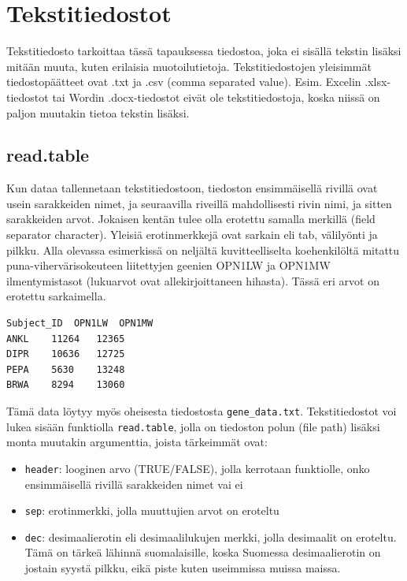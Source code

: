 \documentclass[
]{book}
\providecommand{\tightlist}{%
  \setlength{\itemsep}{0pt}\setlength{\parskip}{0pt}}
\begin{document}
\hypertarget{tekstitiedostot}{%
\section{Tekstitiedostot}\label{tekstitiedostot}}

Tekstitiedosto tarkoittaa tässä tapauksessa tiedostoa, joka ei sisällä tekstin lisäksi mitään muuta, kuten erilaisia muotoilutietoja. Tekstitiedostojen yleisimmät tiedostopäätteet ovat .txt ja .csv (comma separated value). Esim. Excelin .xlsx-tiedostot tai Wordin .docx-tiedostot eivät ole tekstitiedostoja, koska niissä on paljon muutakin tietoa tekstin lisäksi.

\hypertarget{read.table}{%
\subsection{read.table}\label{read.table}}

Kun dataa tallennetaan tekstitiedostoon, tiedoston ensimmäisellä rivillä ovat usein sarakkeiden nimet, ja seuraavilla riveillä mahdollisesti rivin nimi, ja sitten sarakkeiden arvot. Jokaisen kentän tulee olla erotettu samalla merkillä (field separator character). Yleisiä erotinmerkkejä ovat sarkain eli tab, välilyönti ja pilkku. Alla olevassa esimerkissä on neljältä kuvitteelliselta koehenkilöltä mitattu puna-vihervärisokeuteen liitettyjen geenien OPN1LW ja OPN1MW ilmentymistasot (lukuarvot ovat allekirjoittaneen hihasta). Tässä eri arvot on erotettu sarkaimella.

\begin{verbatim}
Subject_ID  OPN1LW  OPN1MW
ANKL    11264   12365
DIPR    10636   12725
PEPA    5630    13248
BRWA    8294    13060
\end{verbatim}

Tämä data löytyy myös oheisesta tiedostosta \texttt{gene\_data.txt}. Tekstitiedostot voi lukea sisään funktiolla \texttt{read.table}, jolla on tiedoston polun (file path) lisäksi monta muutakin argumenttia, joista tärkeimmät ovat:

\begin{itemize}
\tightlist
\item
  \texttt{header}: looginen arvo (TRUE/FALSE), jolla kerrotaan funktiolle, onko ensimmäisellä rivillä sarakkeiden nimet vai ei
\item
  \texttt{sep}: erotinmerkki, jolla muuttujien arvot on eroteltu
\item
  \texttt{dec}: desimaalierotin eli desimaalilukujen merkki, jolla desimaalit on eroteltu. Tämä on tärkeä lähinnä suomalaisille, koska Suomessa desimaalierotin on jostain syystä pilkku, eikä piste kuten useimmissa muissa maissa.
\end{itemize}
\end{document}
